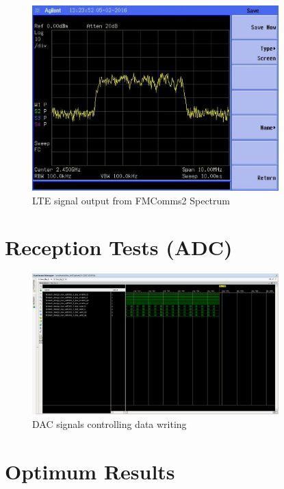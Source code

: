 \begin{figure}[htbp]
    \centering
    \includegraphics[width=0.85\textwidth]{./figures/lte_5m}
    \caption{ LTE signal output from FMComms2 Spectrum
    \label{fig:lte5m}}
\end{figure}

\vfill
\clearpage

\section{Reception Tests (ADC)}
\label{result:adc}

\begin{figure}[htbp]
    \centering
    \includegraphics[width=0.85\textwidth]{./figures/dac_signals}
    \caption{ DAC signals controlling data writing
    \label{fig:adcsignals}}
\end{figure}

\vfill
\clearpage

\section{Optimum Results}
\label{result:optimum}

